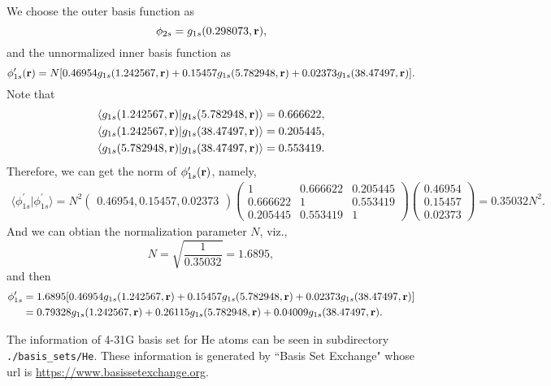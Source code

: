 \documentclass[a4paper]{book}
\newcounter{solution}[chapter]
\newcommand{\bfr}{{\bf r}}
\begin{document}
	\begin{solution}
	
	We choose the outer basis function as
	\[
		\phi_{2s} = g_{1s}( 0.298073 , \bfr ) ,
	\]
	and the unnormalized inner basis function as
	\[
		\phi^\prime_{1s}( \bfr ) = N [ 0.46954 g_{1s}( 1.242567 , \bfr ) + 0.15457 g_{1s}( 5.782948 , \bfr ) + 0.02373 g_{1s}( 38.47497 , \bfr ) ] .
	\]
	Note that
	\begin{align*}
		\langle g_{1s}( 1.242567 , \bfr ) | g_{1s}( 5.782948 , \bfr ) \rangle &= 0.666622 , \\
		\langle g_{1s}( 1.242567 , \bfr ) | g_{1s}( 38.47497 , \bfr ) \rangle &= 0.205445 , \\
		\langle g_{1s}( 5.782948 , \bfr ) | g_{1s}( 38.47497 , \bfr ) \rangle &= 0.553419 .
	\end{align*}
	Therefore, we can get the norm of $\phi^\prime_{1s}( \bfr )$, namely,
	\begin{align*}
		\langle \phi^\prime_{1s} | \phi^\prime_{1s} \rangle = N^2 \begin{pmatrix}
			0.46954 ,  0.15457 , 0.02373
		\end{pmatrix} \begin{pmatrix}
			1 			& 0.666622 	& 0.205445 \\
			0.666622 	& 1			& 0.553419 \\
			0.205445	& 0.553419	& 1
		\end{pmatrix} \begin{pmatrix}
			0.46954 \\  0.15457 \\ 0.02373
		\end{pmatrix} = 0.35032 N^2 .
	\end{align*}
	And we can obtian the normalization parameter $N$, viz.,
	\[
		N = \sqrt{ \frac{1}{ 0.35032 } } = 1.6895 ,
	\]
	and then
	\begin{align*}
		\phi^\prime_{1s} &= 1.6895 [ 0.46954 g_{1s}( 1.242567 , \bfr ) + 0.15457 g_{1s}( 5.782948 , \bfr ) + 0.02373 g_{1s}( 38.47497 , \bfr ) ] \\
		&= 0.79328 g_{1s}( 1.242567 , \bfr ) + 0.26115 g_{1s}( 5.782948 , \bfr ) + 0.04009 g_{1s}( 38.47497 , \bfr ) .
	\end{align*}
	
	The information of 4-31G basis set for He atoms can be seen in subdirectory \verb!./basis_sets/He!. These information is generated by ``Basis Set Exchange" whose url is \url{https://www.basissetexchange.org}.
	
	\end{solution}
	
\end{document}
